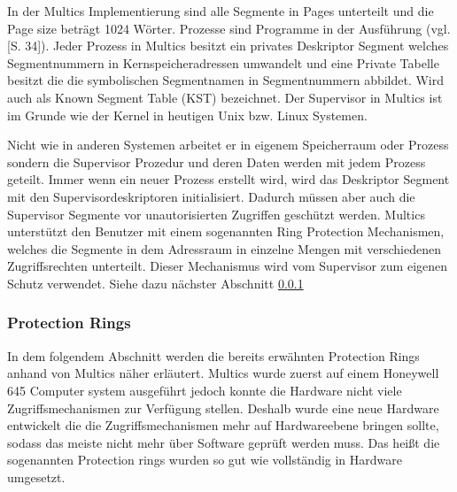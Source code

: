\documentclass[11pt,technote]{IEEEtran}
\begin{document}
	      In der Multics Implementierung sind alle Segmente in Pages unterteilt und die Page size betr\"agt 1024 W\"orter.
        Prozesse sind Programme in der Ausf\"uhrung (vgl. \cite{inproc:multics}[S. 34]). 
		    Jeder Prozess in Multics besitzt ein privates Deskriptor Segment welches Segmentnummern in Kernspeicheradressen umwandelt und eine Private Tabelle besitzt   
		    die die symbolischen Segmentnamen in Segmentnummern abbildet. Wird auch als Known Segment Table (KST) bezeichnet.
		    Der Supervisor in Multics ist im Grunde wie der Kernel in heutigen Unix bzw. Linux Systemen.
		   
      Nicht wie in anderen Systemen arbeitet er in eigenem Speicherraum oder Prozess sondern die Supervisor Prozedur und deren Daten werden mit jedem Prozess
    	  geteilt. Immer wenn ein neuer Prozess erstellt wird, wird das Deskriptor Segment mit den Supervisordeskriptoren initialisiert.
    	  Dadurch m\"ussen aber auch die Supervisor Segmente vor unautorisierten Zugriffen gesch\"utzt werden.
    	  Multics unterst\"utzt den Benutzer mit einem sogenannten Ring Protection Mechanismen, welches die Segmente in dem Adressraum in einzelne Mengen mit 
    		verschiedenen Zugriffsrechten unterteilt. Dieser Mechanismus wird vom Supervisor zum eigenen Schutz verwendet. Siehe dazu n\"achster Abschnitt 
    		\ref{subsubsec:protectrings}
    		
      \subsubsection{Protection Rings} \label{subsubsec:protectrings}
        In dem folgendem Abschnitt werden die bereits erw\"ahnten Protection Rings anhand von Multics n\"aher erl\"autert.
        Multics wurde zuerst auf einem Honeywell 645 Computer system ausgef\"uhrt jedoch konnte die Hardware nicht viele Zugriffsmechanismen zur Verf\"ugung stellen.
        Deshalb wurde eine neue Hardware entwickelt die die Zugriffsmechanismen mehr auf Hardwareebene bringen sollte, sodass das meiste nicht mehr \"uber Software
        gepr\"uft werden muss. Das hei\ss t die sogenannten Protection rings wurden so gut wie vollst\"andig in Hardware umgesetzt. \cite{inproc:protec-rings}
    
\end{document}
